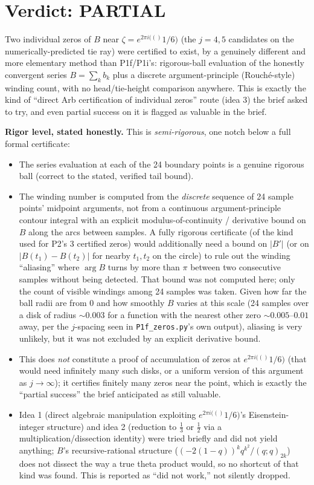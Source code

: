 \documentclass[11pt]{article}
\newcommand{\e}[1]{e^{2\pi i(#1)}}
\begin{document}
\section*{Verdict: PARTIAL}
Two individual zeros of $B$ near $\zeta=\e(1/6)$ (the $j=4,5$ candidates on the numerically-predicted tie ray) were certified to exist, by a genuinely different and more elementary method than P1f/P1i's: rigorous-ball evaluation of the honestly convergent series $B=\sum_k b_k$ plus a discrete argument-principle (Rouch\'e-style) winding count, with no head/tie-height comparison anywhere. This is exactly the kind of ``direct Arb certification of individual zeros'' route (idea 3) the brief asked to try, and even partial success on it is flagged as valuable in the brief.

\textbf{Rigor level, stated honestly.} This is \emph{semi-rigorous}, one notch below a full formal certificate:
\begin{itemize}
\item The series evaluation at each of the 24 boundary points is a genuine rigorous ball (correct to the stated, verified tail bound).
\item The winding number is computed from the \emph{discrete} sequence of 24 sample points' midpoint arguments, not from a continuous argument-principle contour integral with an explicit modulus-of-continuity / derivative bound on $B$ along the arcs between samples. A fully rigorous certificate (of the kind used for P2's 3 certified zeros) would additionally need a bound on $|B'|$ (or on $|B(t_1)-B(t_2)|$ for nearby $t_1,t_2$ on the circle) to rule out the winding ``aliasing'' where $\arg B$ turns by more than $\pi$ between two consecutive samples without being detected. That bound was not computed here; only the count of visible windings among 24 samples was taken. Given how far the ball radii are from $0$ and how smoothly $B$ varies at this scale (24 samples over a disk of radius $\sim0.003$ for a function with the nearest other zero $\sim0.005$--$0.01$ away, per the $j$-spacing seen in \texttt{P1f\_zeros.py}'s own output), aliasing is very unlikely, but it was not excluded by an explicit derivative bound.
\item This does \emph{not} constitute a proof of accumulation of zeros at $\e(1/6)$ (that would need infinitely many such disks, or a uniform version of this argument as $j\to\infty$); it certifies finitely many zeros near the point, which is exactly the ``partial success'' the brief anticipated as still valuable.
\item Idea 1 (direct algebraic manipulation exploiting $\e(1/6)$'s Eisenstein-integer structure) and idea 2 (reduction to $\frac13$ or $\frac12$ via a multiplication/dissection identity) were tried briefly and did not yield anything; $B$'s recursive-rational structure ($(-2(1-q))^kq^{k^2}/(q;q)_{2k}$) does not dissect the way a true theta product would, so no shortcut of that kind was found. This is reported as ``did not work,'' not silently dropped.
\end{itemize}
\end{document}
